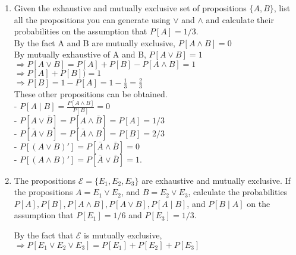 \documentclass[
  12pt,
]{article}
\begin{document}
\setcounter{equation}{0}
\begin{enumerate}

\item Given the exhaustive and mutually exclusive set of propositions $\{A,B\}$, list all the propositions you can generate using $\vee$ and $\wedge$ and calculate their probabilities on the assumption that $P[A]=1/3$. \\
{
\color{blue}
By the fact A and B are mutually exclusive, $P[A \wedge B] = 0$\\
By mutually exhaustive of A and B, $P[A \vee B] = 1$\\ 
$\Rightarrow P[A \vee B] = P[A] + P[B] - P[A \wedge B] = 1$\\
$\Rightarrow P[A] +P[B])= 1$\\
$\Rightarrow P[B] = 1- P[A]= 1-\frac{1}{3}=\frac{2}{3}$\\
These other propositions can be obtained.\\
- $P[A\mid B]=\frac{P[A \wedge B]}{P[B]}=0$\\
- $P[A\vee \bar{B}]=P[A\wedge \bar{B}]=P[A]=1/3$\\
- $P[\bar{A} \vee B]=P[\bar A\wedge B]=P[B]=2/3$\\
- $P[(A \vee B)']=P[\bar A\wedge \bar B]=0$\\
- $P[(A \wedge B)']=P[\bar A\vee \bar B]=1$.
}


\item The propositions $\mathcal{E} = \{E_1,E_2,E_3\}$ are exhaustive and mutually exclusive. If the propositions $A=E_1\vee E_2$, and $B=E_2\vee E_3$, calculate the probabilities $P[A], P[B], P[A\wedge B], P[A\vee B], P[A\mid B]$, and $P[B\mid A]$ on the assumption that $P[E_1]=1/6$ and $P[E_3]=1/3$. 
{
\color{blue}

By the fact that $\mathcal{E}$ is mutually exclusive,\\
$\Rightarrow P[ E_1 \vee E_2 \vee E_3] = P[E_1] + P[E_2] + P[E_3]$

}
\end{enumerate}
\end{document}
